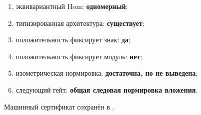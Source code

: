 \begin{protocol}\begin{enumerate}
\item эквивариантный Hom: \textbf{одномерный};
\item типизированная архитектура: \textbf{существует};
\item положительность фиксирует знак: \textbf{да};
\item положительность фиксирует модуль: \textbf{нет};
\item изометрическая нормировка: \textbf{достаточна, но не выведена};
\item следующий гейт: \textbf{общая следовая нормировка вложения}.
\end{enumerate}\end{protocol}

Машинный сертификат сохранён в
.